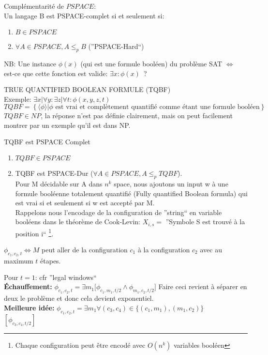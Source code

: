 \documentclass[a4paper,12pt]{article}
\begin{document}
    Complémentarité de $PSPACE$:\\
    Un langage B est PSPACE-complet si et seulement si:
    \begin{enumerate}
     \item $B \in PSPACE$
     \item $\forall A \in PSPACE, A \leq_p B$ (''PSPACE-Hard``)
    \end{enumerate}
    NB: Une instance $\phi(x)$ (qui est une formule booléen) du problème SAT $\Leftrightarrow$ est-ce que cette fonction est valide: $\exists x : \phi(x)$~?

    TRUE QUANTIFIED BOOLEAN FORMULE (TQBF)\\
    Exemple: $\exists x | \forall y : \exists z | \forall t : \phi(x, y, z, t)$\\

    \begin{equation*}
      TQBF = \left\{\langle \phi\rangle | \phi \text{ est vrai et complètement quantifié comme étant une formule booléen}\right\}
    \end{equation*}
    $TQBF \in NP$, la réponse n'est pas définie clairement, mais on peut facilement montrer par un exemple qu'il est dans NP.

    \begin{theoremeBox}
      TQBF est PSPACE Complet
      \begin{enumerate}
       \item $TQBF \in PSPACE$
       \item TQBF est PSPACE-Dur ($\forall A \in PSPACE, A \leq_p TQBF$).\\
	Pour M décidable sur A dans $n^k$ space, nous ajoutons un input w à une formule booléenne totalement quantifié (Fully quantified Boolean formula) qui est vrai si et seulement si
	w est accepté par M.\\
	Rappelons nous l'encodage de la configuration de ''string`` en variable booléens dans le théorème de Cook-Levin: $X_{i, s} =$ ''Symbole S est trouvé à la position i`` \footnote{Chaque configuration peut être encodé avec $O(n^k)$ variables booléen}.
      \end{enumerate}
    \end{theoremeBox}
    $\phi_{c_1, c_2, t} \Leftrightarrow M$ peut aller de la configuration $c_1$ à la configuration $c_2$ avec au maximum $t$ étapes.

    Pour $t = 1$: cfr ''legal windows``\\
    \textbf{Échauffement:} $\phi_{c_1, c_2, t} = \exists m_1 \big[\phi_{c_1, m_1, t/2} \wedge \phi_{m_1, c_2, t/2}\big]$
    Faire ceci revient à séparer en deux le problème et donc cela devient exponentiel.\\
    \textbf{Meilleure idée:} $\phi_{c_1, c_2, t} = \exists m_1 \forall (c_3, c_4) \in \big\{(c_1, m_1), (m_1, c_2)\big\}$\\
    $[\phi_{c_3, c_4, t/2}]$
\end{document}
